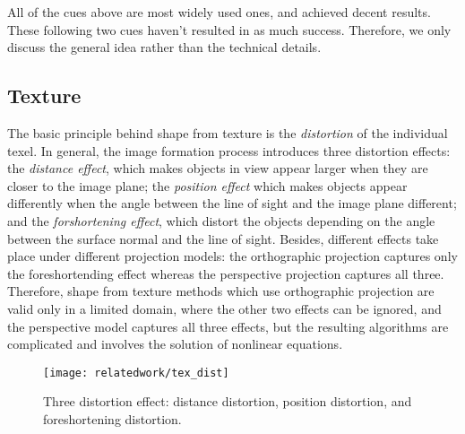 
All of the cues above are most widely used ones, and achieved decent results. These following two cues haven't resulted in as much success. Therefore, we only discuss the general idea rather than the technical details.

\subsection{Texture}
The basic principle behind shape from texture is the \textit{distortion} of the individual texel. In general, the image formation process introduces three distortion effects: the \textit{distance effect}, which makes objects in view appear larger when they are closer to the image plane; the \textit{position effect} which makes objects appear differently when the angle between the line of sight and the image plane different; and the \textit{forshortening effect}, which distort the objects depending on the angle between the surface normal and the line of sight. Besides, different effects take place under different projection models: the orthographic projection captures only the foreshortending effect whereas the perspective projection captures all three. Therefore, shape from texture methods which use orthographic projection are valid only in a limited domain, where the other two effects can be ignored, and the perspective model captures all three effects, but the resulting algorithms are complicated and involves the solution of nonlinear equations.
\begin{figure}[h]
\centering
\texttt{[image: relatedwork/tex\_dist]}
\caption{Three distortion effect: distance distortion, position distortion, and foreshortening distortion.}
\label{fig:tex_dist}
\end{figure}

